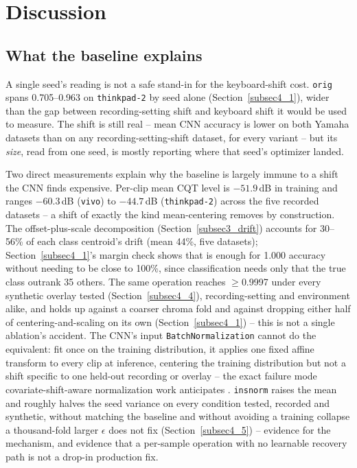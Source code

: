 \documentclass[pdflatex,sn-mathphys-num,iicol]{sn-jnl}
\theoremstyle{thmstyleone}
\theoremstyle{thmstyletwo}
\theoremstyle{thmstylethree}
\begin{document}
\section{Discussion}\label{sec5}

\subsection{What the baseline explains}\label{subsec5_0}

A single seed's reading is not a safe stand-in for the keyboard-shift cost. \texttt{orig} spans 0.705--0.963 on \texttt{thinkpad-2} by seed alone (Section~\ref{subsec4_1}), wider than the gap between recording-setting shift and keyboard shift it would be used to measure. The shift is still real -- mean CNN accuracy is lower on both Yamaha datasets than on any recording-setting-shift dataset, for every variant -- but its \emph{size}, read from one seed, is mostly reporting where that seed's optimizer landed.

Two direct measurements explain why the baseline is largely immune to a shift the CNN finds expensive. Per-clip mean CQT level is $-51.9$\,dB in training and ranges $-60.3$\,dB (\texttt{vivo}) to $-44.7$\,dB (\texttt{thinkpad-2}) across the five recorded datasets -- a shift of exactly the kind mean-centering removes by construction. The offset-plus-scale decomposition (Section~\ref{subsec3_drift}) accounts for 30--56\% of each class centroid's drift (mean 44\%, five datasets); Section~\ref{subsec4_1}'s margin check shows that is enough for 1.000 accuracy without needing to be close to 100\%, since classification needs only that the true class outrank 35 others. The same operation reaches $\geq$0.9997 under every synthetic overlay tested (Section~\ref{subsec4_4}), recording-setting and environment alike, and holds up against a coarser chroma fold and against dropping either half of centering-and-scaling on its own (Section~\ref{subsec4_1}) -- this is not a single ablation's accident. The CNN's input \texttt{BatchNormalization} cannot do the equivalent: fit once on the training distribution, it applies one fixed affine transform to every clip at inference, centering the training distribution but not a shift specific to one held-out recording or overlay -- the exact failure mode covariate-shift-aware normalization work anticipates \cite{Li2016}\cite{Ulyanov2016}. \texttt{insnorm} raises the mean and roughly halves the seed variance on every condition tested, recorded and synthetic, without matching the baseline and without avoiding a training collapse a thousand-fold larger $\epsilon$ does not fix (Section~\ref{subsec4_5}) -- evidence for the mechanism, and evidence that a per-sample operation with no learnable recovery path is not a drop-in production fix.
\end{document}
